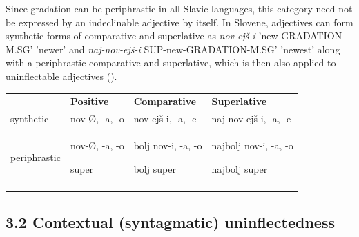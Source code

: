 \documentclass[output=paper]{langscibook}
\begin{document}
Since gradation can be periphrastic in all Slavic languages, this category need not be expressed by an indeclinable adjective by itself. In Slovene, adjectives can form synthetic forms of comparative and superlative as \textit{nov-ejš-i} 'new-GRADATION-M.SG' 'newer' and \textit{naj-nov-ejš-i} SUP-new-GRADATION-M.SG' 'newest' along with a periphrastic comparative and superlative, which is then also applied to uninflectable adjectives ().


\begin{tabularx}{\textwidth}{XXXX}
 & \textbf{Positive} & \textbf{Comparative} & \textbf{Superlative}\\
\lsptoprule
synthetic & nov-Ø, -a, -o & nov-ejš-i, -a, -e & naj-nov-ejš-i, -a, -e\\
periphrastic & nov-Ø, -a, -o

super & bolj nov-i, -a, -o

bolj super & najbolj nov-i, -a, -o

najbolj super\\
\lspbottomrule
\end{tabularx}
\begin{table}
\caption{Gradation of adjectives in Slovene} 
\label{tab:key:5}
\end{table}

\subsection{3.2 Contextual (syntagmatic)\footnotemark{} uninflectedness}
\end{document}
